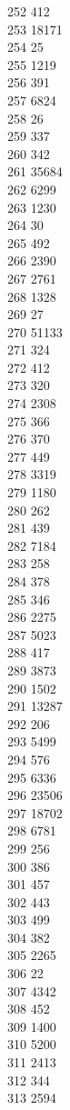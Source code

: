 { 252	412 \\
 253	18171 \\
 254	25 \\
 255	1219 \\
 256	391 \\
 257	6824 \\
 258	26 \\
 259	337 \\
 260	342 \\
 261	35684 \\
 262	6299 \\
 263	1230 \\
 264	30 \\
 265	492 \\
 266	2390 \\
 267	2761 \\
 268	1328 \\
 269	27 \\
 270	51133 \\
 271	324 \\
 272	412 \\
 273	320 \\
 274	2308 \\
 275	366 \\
 276	370 \\
 277	449 \\
 278	3319 \\
 279	1180 \\
 280	262 \\
 281	439 \\
 282	7184 \\
 283	258 \\
 284	378 \\
 285	346 \\
 286	2275 \\
 287	5023 \\
 288	417 \\
 289	3873 \\
 290	1502 \\
 291	13287 \\
 292	206 \\
 293	5499 \\
 294	576 \\
 295	6336 \\
 296	23506 \\
 297	18702 \\
 298	6781 \\
 299	256 \\
 300	386 \\
 301	457 \\
 302	443 \\
 303	499 \\
 304	382 \\
 305	2265 \\
 306	22 \\
 307	4342 \\
 308	452 \\
 309	1400 \\
 310	5200 \\
 311	2413 \\
 312	344 \\
 313	2594 \\
}
